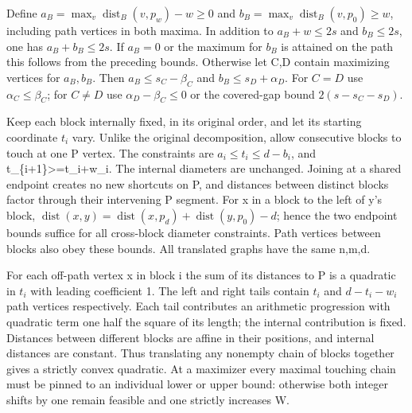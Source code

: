 \documentclass[
  11pt,
]{article}
\begin{document}
Define \(a_B=\max_v\operatorname{dist}_B(v,p_w)-w\ge0\) and
\(b_B=\max_v\operatorname{dist}_B(v,p_0)\ge w\), including path vertices
in both maxima. In addition to \(a_{B}+w\le 2s\) and \(b_{B}\le 2s\),
one has \(a_{B}+b_{B}\le 2s\). If \(a_{B}=0\) or the maximum for
\(b_{B}\) is attained on the path this follows from the preceding
bounds. Otherwise let C,D contain maximizing vertices for
\(a_{B},b_{B}\). Then \(a_{B}\le s_{C}-\beta _{C}\) and
\(b_{B}\le s_{D}+\alpha _{D}\). For \(C=D\) use
\(\alpha _{C}\le \beta _{C}\); for \(C\ne D\) use
\(\alpha _{D}-\beta _{C}\le 0\) or the covered-gap bound
\(2(s-s_{C}-s_{D})\).

Keep each block internally fixed, in its original order, and let its
starting coordinate \(t_{i}\) vary. Unlike the original decomposition,
allow consecutive blocks to touch at one P vertex. The constraints are
\(a_{i}\le t_{i}\le d-b_{i}\), and t\_\{i+1\}\textgreater=t\_i+w\_i. The
internal diameters are unchanged. Joining at a shared endpoint creates
no new shortcuts on P, and distances between distinct blocks factor
through their intervening P segment. For x in a block to the left of y's
block,
\(\operatorname{dist}(x,y)=\operatorname{dist}(x,p_{d})+\operatorname{dist}(y,p_{0})-d\);
hence the two endpoint bounds suffice for all cross-block diameter
constraints. Path vertices between blocks also obey these bounds. All
translated graphs have the same n,m,d.

For each off-path vertex x in block i the sum of its distances to P is a
quadratic in \(t_{i}\) with leading coefficient 1. The left and right
tails contain \(t_{i}\) and \(d-t_{i}-w_{i}\) path vertices
respectively. Each tail contributes an arithmetic progression with
quadratic term one half the square of its length; the internal
contribution is fixed. Distances between different blocks are affine in
their positions, and internal distances are constant. Thus translating
any nonempty chain of blocks together gives a strictly convex quadratic.
At a maximizer every maximal touching chain must be pinned to an
individual lower or upper bound: otherwise both integer shifts by one
remain feasible and one strictly increases W.
\end{document}
